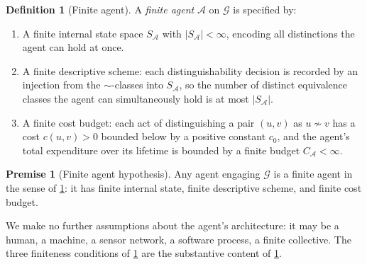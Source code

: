 \documentclass[11pt,twocolumn,a4paper]{article}
\theoremstyle{thmstyle}
\theoremstyle{definition}
\newtheorem{definition}[theorem]{Definition}
\newtheorem{axiom}{Premise}
\theoremstyle{remark}
\newcommand{\Graph}{\mathcal{G}}
\newcommand{\Agent}{\mathcal{A}}
\begin{document}
\begin{definition}[Finite agent]
\label{def:agent}
A \emph{finite agent} $\Agent$ on $\Graph$ is specified by:
\begin{enumerate}[label=(F\arabic*),leftmargin=2.6em,nosep]
\item\label{F:fin_state} A finite internal state space $S_\Agent$
with $|S_\Agent| < \infty$, encoding all distinctions the agent can
hold at once.
\item\label{F:fin_descr} A finite descriptive scheme: each
distinguishability decision is recorded by an injection from the
$\sim$-classes into $S_\Agent$, so the number of distinct
equivalence classes the agent can simultaneously hold is at most
$|S_\Agent|$.
\item\label{F:fin_cost} A finite cost budget: each act of
distinguishing a pair $(u,v)$ as $u \not\sim v$ has a cost
$c(u,v) > 0$ bounded below by a positive constant $c_0$, and the
agent's total expenditure over its lifetime is bounded by a finite
budget $C_{\Agent} < \infty$.
\end{enumerate}
\end{definition}

\begin{axiom}[Finite agent hypothesis]
\label{ax:agent}
Any agent engaging $\Graph$ is a finite agent in the sense of
\cref{def:agent}: it has finite internal state, finite descriptive
scheme, and finite cost budget.
\end{axiom}

We make no further assumptions about the agent's architecture: it
may be a human, a machine, a sensor network, a software process, a
finite collective. The three finiteness conditions of
\cref{def:agent} are the substantive content of \cref{ax:agent}.
\end{document}
